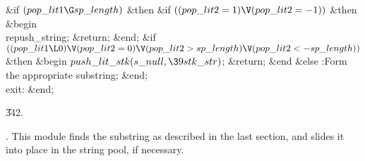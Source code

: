 \&{if} $(\\{pop\_lit1}\G\\{sp\_length})$ \1\&{then}\6
\&{if} $((\\{pop\_lit2}=1)\V(\\{pop\_lit2}=-1))$ \1\&{then}\6
\&{begin} \\{repush\_string};\5
\&{return};\6
\&{end};\2\2\6
\&{if} $((\\{pop\_lit1}\L0)\V(\\{pop\_lit2}=0)\V(\\{pop\_lit2}>\\{sp\_length})%
\V(\\{pop\_lit2}<-\\{sp\_length}))$ \1\&{then}\6
\&{begin} $\\{push\_lit\_stk}(\\{s\_null},\39\\{stk\_str})$;\5
\&{return};\6
\&{end}\6
\4\&{else} :Form the appropriate substring\X;\2\6
\&{end};\2\2\2\6
\4\\{exit}: \&{end};\par
\U342.\fi

.
This module finds the substring as described in the last section,
and slides it into place in the string pool, if necessary.

